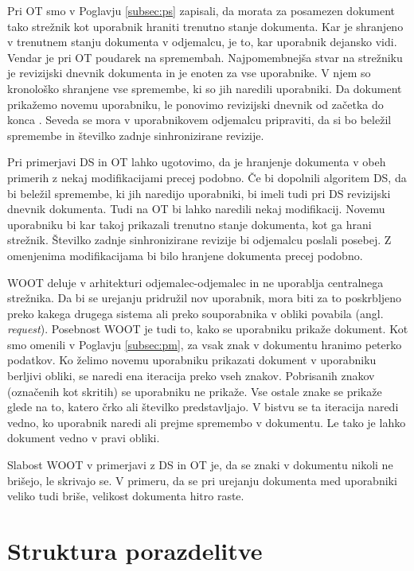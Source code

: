 \documentclass[a4paper, 12pt, twoside]{book}
\begin{document}
Pri OT smo v Poglavju \ref{subsec:ps} zapisali, da morata za posamezen dokument tako strežnik kot uporabnik hraniti trenutno stanje dokumenta. Kar je shranjeno v trenutnem stanju dokumenta v odjemalcu, je to, kar uporabnik dejansko vidi. Vendar je pri OT poudarek na spremembah. Najpomembnejša stvar na strežniku je revizijski dnevnik dokumenta in je enoten za vse uporabnike. V njem so kronološko shranjene vse spremembe, ki so jih naredili uporabniki. Da dokument prikažemo novemu uporabniku, le ponovimo revizijski dnevnik od začetka do konca \cite{gdocs22}. Seveda se mora v uporabnikovem odjemalcu pripraviti, da si bo beležil spremembe in številko zadnje sinhronizirane revizije.

Pri primerjavi DS in OT lahko ugotovimo, da je hranjenje dokumenta v obeh primerih z nekaj modifikacijami precej podobno. Če bi dopolnili algoritem DS, da bi beležil spremembe, ki jih naredijo uporabniki, bi imeli tudi pri DS revizijski dnevnik dokumenta. Tudi na OT bi lahko naredili nekaj modifikacij. Novemu uporabniku bi kar takoj prikazali trenutno stanje dokumenta, kot ga hrani strežnik. Številko zadnje sinhronizirane revizije bi odjemalcu poslali posebej. Z omenjenima modifikacijama bi bilo hranjene dokumenta precej podobno.

WOOT deluje v arhitekturi odjemalec-odjemalec in ne uporablja centralnega strežnika. Da bi se urejanju pridružil nov uporabnik, mora biti za to poskrbljeno preko kakega drugega sistema ali preko souporabnika v obliki povabila (angl. \textit{request}). Posebnost WOOT je tudi to, kako se uporabniku prikaže dokument. Kot smo omenili v Poglavju \ref{subsec:pm}, za vsak znak v dokumentu hranimo peterko podatkov. Ko želimo novemu uporabniku prikazati dokument v uporabniku berljivi obliki, se naredi ena iteracija preko vseh znakov. Pobrisanih znakov (označenih kot skritih) se uporabniku ne prikaže. Vse ostale znake se prikaže glede na to, katero črko ali številko predstavljajo. V bistvu se ta iteracija naredi vedno, ko uporabnik naredi ali prejme spremembo v dokumentu. Le tako je lahko dokument vedno v pravi obliki.

Slabost WOOT v primerjavi z DS in OT je, da se znaki v dokumentu nikoli ne brišejo, le skrivajo se. V primeru, da se pri urejanju dokumenta med uporabniki veliko tudi briše, velikost dokumenta hitro raste.

\section{Struktura porazdelitve}
\end{document}
